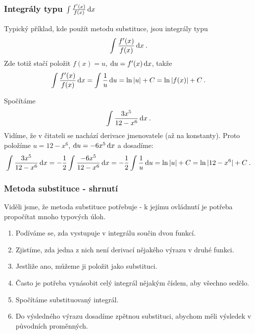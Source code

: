 \subsubsection*{Integrály typu $\int \frac{f'(x)}{f(x)}\, \mathrm{d} x$}
Typický příklad, kde použít metodu substituce, jsou integrály typu \begin{align}
    \int \frac{f'(x)}{f(x)} \, \mathrm{d} x \:.
\end{align}
Zde totiž stačí položit $f(x) = u$, $\mathrm{d} u = f'(x) \, \mathrm{d} x$, takže \begin{align}
    \int \frac{f'(x)}{f(x)} \, \mathrm{d} x = \int \frac{1}{u} \, \mathrm{d} u = \ln |u| + C = \ln |f(x)| + C \:.
\end{align}

\begin{example}
    Spočítáme \begin{align}
        \int \frac{3x^5}{12-x^6} \, \mathrm{d} x \:.
    \end{align}
    Vidíme, že v čitateli se nachází derivace jmenovatele (až na konstanty). Proto položíme $u = 12 - x^6$, $\mathrm{d} u = - 6 x^5 \, \mathrm{d} x$ a dosadíme:
    \begin{align}
        \int \frac{3x^5}{12-x^6} \, \mathrm{d} x = -\frac{1}{2} \int \frac{-6x^5}{12-x^6} \, \mathrm{d} x = -\frac{1}{2} \int \frac{1}{u} \, \mathrm{d} u = \ln |u| + C = \ln |12-x^6| + C \:.
    \end{align}
\end{example}



\subsubsection*{Metoda substituce - shrnutí}

Viděli jsme, že metoda substituce potřebuje  - k jejímu ovládnutí je potřeba propočítat mnoho typových úloh.

\begin{enumerate}
    \item Podíváme se, zda vystupuje v integrálu součin dvou funkcí.
    \item Zjistíme, zda jedna z nich není derivací nějakého výrazu v druhé funkci.
    \item Jestliže ano, můžeme ji položit jako substituci.
    \item Často je potřeba vynásobit celý integrál nějakým číslem, aby všechno sedělo.
    \item Spočítáme substituovaný integrál.
    \item Do výsledného výrazu dosadíme zpětnou substituci, abychom měli výsledek v původních proměnných.
\end{enumerate}

